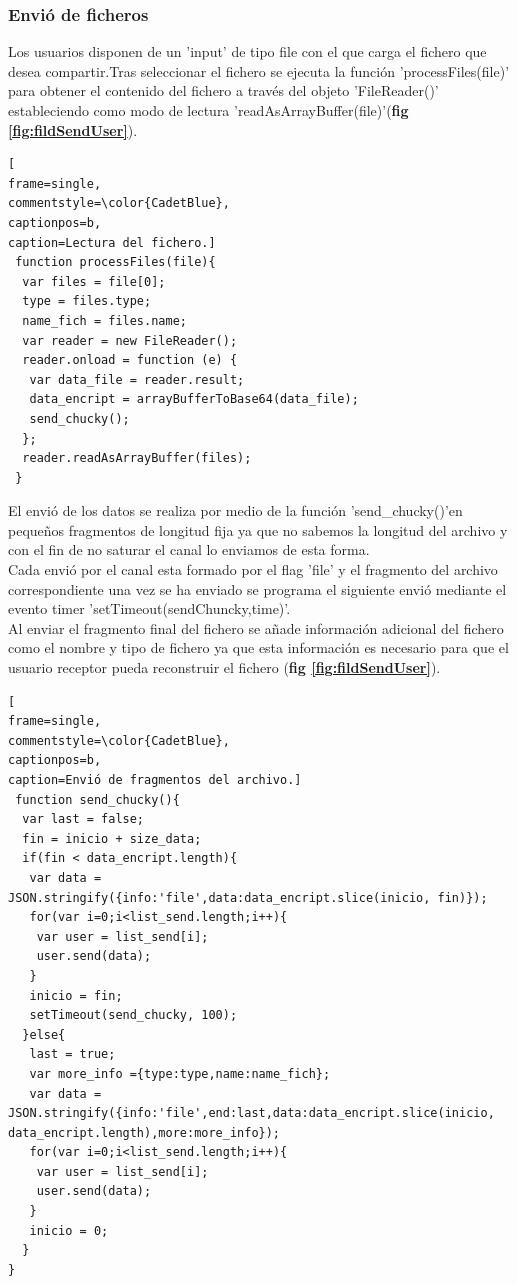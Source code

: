 \subsubsection{Envió de ficheros}
Los usuarios disponen de un 'input' de tipo file con el que carga el fichero que desea compartir.Tras seleccionar el fichero se ejecuta la función 'processFiles(file)' para obtener el contenido del fichero a través del objeto 'FileReader()' estableciendo como modo de lectura 'readAsArrayBuffer(file)'(\textbf{fig \ref{fig:fildSendUser}}). 
\begin{lstlisting}[
frame=single,
commentstyle=\color{CadetBlue},
captionpos=b,
caption=Lectura del fichero.]
 function processFiles(file){
  var files = file[0];
  type = files.type;
  name_fich = files.name;
  var reader = new FileReader();
  reader.onload = function (e) {
   var data_file = reader.result;
   data_encript = arrayBufferToBase64(data_file);
   send_chucky();
  };
  reader.readAsArrayBuffer(files);
 }
\end{lstlisting}
El envió de los datos se realiza por medio de la función 'send\_chucky()'en pequeños fragmentos de longitud fija ya que no sabemos la longitud del archivo y con el fin de no saturar el canal lo enviamos de esta forma.
\\Cada envió por el canal esta formado por el flag 'file' y el fragmento del archivo correspondiente una vez se ha enviado se programa el siguiente envió mediante el evento timer 'setTimeout(sendChuncky,time)'.
\\Al enviar el fragmento final del fichero se añade información adicional del fichero como el nombre y tipo de fichero ya que esta información es necesario para que el usuario receptor pueda reconstruir el fichero (\textbf{fig \ref{fig:fildSendUser}}).
\begin{lstlisting}[
frame=single,
commentstyle=\color{CadetBlue},
captionpos=b,
caption=Envió de fragmentos del archivo.]
 function send_chucky(){
  var last = false;
  fin = inicio + size_data;
  if(fin < data_encript.length){
   var data = JSON.stringify({info:'file',data:data_encript.slice(inicio, fin)});
   for(var i=0;i<list_send.length;i++){
    var user = list_send[i];
    user.send(data);
   }
   inicio = fin;
   setTimeout(send_chucky, 100);
  }else{
   last = true;
   var more_info ={type:type,name:name_fich};
   var data = JSON.stringify({info:'file',end:last,data:data_encript.slice(inicio, data_encript.length),more:more_info});
   for(var i=0;i<list_send.length;i++){
    var user = list_send[i];
    user.send(data);
   }
   inicio = 0;
  }
}
\end{lstlisting}
